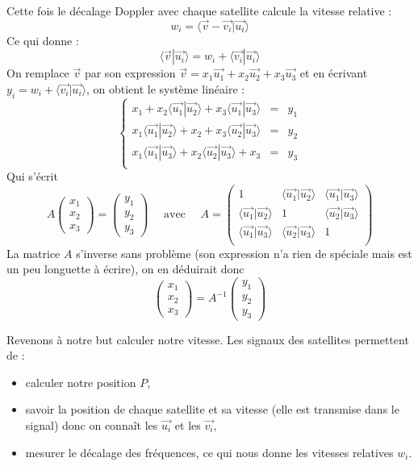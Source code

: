 \documentclass[class=report,crop=false]{standalone}
\newcommand{\vect}{\overrightarrow}
\begin{document}
Cette fois le décalage Doppler avec chaque satellite calcule la vitesse relative :
$$w_i = \langle \vect{v}-\vect{v_i} | \vect{u_i} \rangle$$
Ce qui donne :
$$
\langle \vect{v} | \vect{u_i} \rangle
= w_i + \langle \vect{v_i} | \vect{u_i} \rangle$$
On remplace $\vect v$ par son expression 
$\vect v = x_1 \vect{u_1}+x_2 \vect{u_2}+x_3 \vect{u_3}$ et en 
écrivant $y_i = w_i + \langle \vect{v_i} | \vect{u_i} \rangle$, on obtient le système linéaire :
$$\left\{
\begin{array}{rcl}
x_1+ x_2 \langle \vect{u_1} | \vect{u_2}\rangle + x_3 \langle\vect{u_1} | \vect{u_3} \rangle & = & y_1\\
x_1\langle \vect{u_1} | \vect{u_2}\rangle+ x_2  + x_3 \langle\vect{u_2} | \vect{u_3} \rangle & = & y_2\\ 
x_1\langle\vect{u_1} | \vect{u_3} \rangle+ x_2 \langle \vect{u_2} | \vect{u_3}\rangle + x_3  & = & y_3\\ 
\end{array}
\right.$$
Qui s'écrit 
$$A \begin{pmatrix}x_1\\x_2\\x_3\end{pmatrix} = \begin{pmatrix}y_1\\y_2\\y_3\end{pmatrix}
\quad \text{ avec } \quad
A = 
\begin{pmatrix}
  1 & \langle \vect{u_1} | \vect{u_2} \rangle & \langle\vect{u_1} | \vect{u_3}\rangle\\ 
\langle \vect{u_1} | \vect{u_2} \rangle & 1 & \langle \vect{u_2} | \vect{u_3}\rangle \\
  \langle\vect{u_1} | \vect{u_3}\rangle & \langle \vect{u_2} | \vect{u_3}\rangle & 1 \\
\end{pmatrix}$$
La matrice $A$ s'inverse sans problème 
(son expression n'a rien de spéciale mais est un peu longuette à écrire),
on en déduirait donc
$$\begin{pmatrix}x_1\\x_2\\x_3\end{pmatrix} 
= A^{-1} \begin{pmatrix}y_1\\y_2\\y_3\end{pmatrix}$$


Revenons à notre but calculer notre vitesse. Les signaux des satellites permettent de :
\begin{itemize}
  \item calculer notre position $P$,
  \item savoir la position de chaque satellite et sa vitesse (elle est transmise dans le signal) 
  donc on connaît les $\vect{u_i}$ et les $\vect{v_i}$,
  \item mesurer le décalage des fréquences, ce qui  nous donne les vitesses relatives $w_i$.
\end{itemize}
\end{document}
